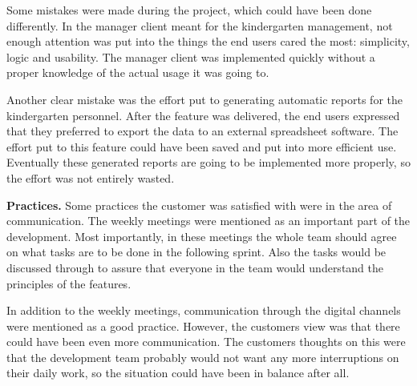 Some mistakes were made during the project, which could have been done differently. In the manager client meant for the kindergarten management, not enough attention was put into the things the end users cared the most: simplicity, logic and usability. The manager client was implemented quickly without a proper knowledge of the actual usage it was going to.

Another clear mistake was the effort put to generating automatic reports for the kindergarten personnel. After the feature was delivered, the end users expressed that they preferred to export the data to an external spreadsheet software. The effort put to this feature could have been saved and put into more efficient use. Eventually these generated reports are going to be implemented more properly, so the effort was not entirely wasted.




\textbf{Practices.} Some practices the customer was satisfied with were in the area of communication. The weekly meetings were mentioned as an important part of the development. Most importantly, in these meetings the whole team should agree on what tasks are to be done in the following sprint. Also the tasks would be discussed through to assure that everyone in the team would understand the principles of the features.

In addition to the weekly meetings, communication through the digital channels were mentioned as a good practice. However, the customers view was that there could have been even more communication. The customers thoughts on this were that the development team probably would not want any more interruptions on their daily work, so the situation could have been in balance after all.


